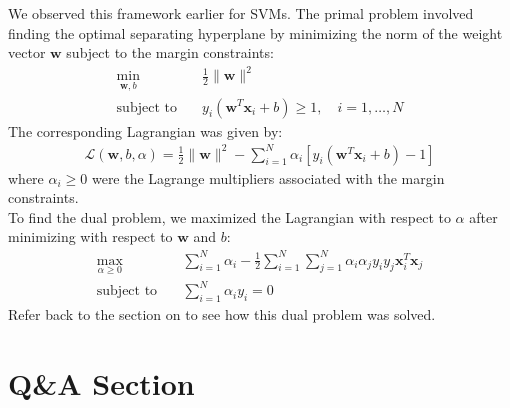 \documentclass{article}
\begin{document}
We observed this framework earlier for SVMs. The primal problem involved finding the optimal separating hyperplane by minimizing the norm of the weight vector \( \mathbf{w} \) subject to the margin constraints:
\begin{align*}
    \min_{\mathbf{w}, b} \quad & \frac{1}{2} \|\mathbf{w}\|^2 \\
    \text{subject to} \quad & y_i (\mathbf{w}^T \mathbf{x}_i + b) \geq 1, \quad i = 1, \dots, N
\end{align*}
The corresponding Lagrangian was given by:
\begin{align*}
    \mathcal{L}(\mathbf{w}, b, \alpha) = \frac{1}{2} \|\mathbf{w}\|^2 - \sum_{i=1}^{N} \alpha_i [y_i (\mathbf{w}^T \mathbf{x}_i + b) - 1]
\end{align*}
where \( \alpha_i \geq 0 \) were the Lagrange multipliers associated with the margin constraints.
\\
To find the dual problem, we maximized the Lagrangian with respect to \( \alpha \) after minimizing with respect to \( \mathbf{w} \) and \( b \):
\begin{align*}
    \max_{\alpha \geq 0} \quad & \sum_{i=1}^{N} \alpha_i - \frac{1}{2} \sum_{i=1}^{N} \sum_{j=1}^{N} \alpha_i \alpha_j y_i y_j \mathbf{x}_i^T \mathbf{x}_j \\
    \text{subject to} \quad & \sum_{i=1}^{N} \alpha_i y_i = 0
\end{align*}
Refer back to the section on  to see how this dual problem was solved.

\section{Q\&A Section}
\end{document}
